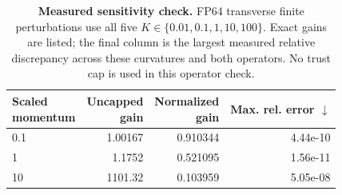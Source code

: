 \begin{table}[t]
\centering
\caption{\textbf{Measured sensitivity check.} FP64 transverse finite perturbations use all five $K\in\{0.01,0.1,1,10,100\}$. Exact gains are listed; the final column is the largest measured relative discrepancy across these curvatures and both operators. No trust cap is used in this operator check.}
\label{tab:sensitivity}
\footnotesize\setlength{\tabcolsep}{4.2pt}\renewcommand{\arraystretch}{1.12}
\begin{adjustbox}{max width=\linewidth}
\begin{tabular}{lrrr}
\toprule
\makecell{Scaled\\momentum} & \makecell{Uncapped\\gain} & \makecell{Normalized\\gain} & \makecell{Max. rel.\\error $\downarrow$} \\
\midrule
0.1 & 1.00167 & 0.910344 & 4.44e-10 \\
1 & 1.1752 & 0.521095 & 1.56e-11 \\
10 & 1101.32 & 0.103959 & 5.05e-08 \\
\bottomrule
\end{tabular}
\end{adjustbox}
\end{table}
